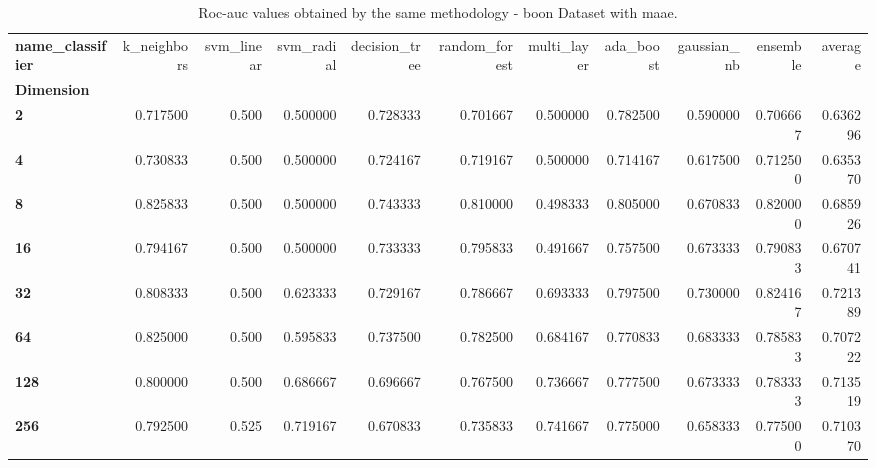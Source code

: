 \begin{table}
\centering
\caption{Roc-auc values obtained by the same methodology - boon Dataset with maae.}
\label{roc-auc_boon_maae-reproduction}
\begin{tabular}{lrrrrrrrrrr}
\toprule
\textbf{name\_classifier} &  k\_neighbors &  svm\_linear &  svm\_radial &  decision\_tree &  random\_forest &  multi\_layer &  ada\_boost &  gaussian\_nb &  ensemble &   average \\
\textbf{Dimension} &              &             &             &                &                &              &            &              &           &           \\
\midrule
\textbf{2        } &     0.717500 &       0.500 &    0.500000 &       0.728333 &       0.701667 &     0.500000 &   0.782500 &     0.590000 &  0.706667 &  0.636296 \\
\textbf{4        } &     0.730833 &       0.500 &    0.500000 &       0.724167 &       0.719167 &     0.500000 &   0.714167 &     0.617500 &  0.712500 &  0.635370 \\
\textbf{8        } &     0.825833 &       0.500 &    0.500000 &       0.743333 &       0.810000 &     0.498333 &   0.805000 &     0.670833 &  0.820000 &  0.685926 \\
\textbf{16       } &     0.794167 &       0.500 &    0.500000 &       0.733333 &       0.795833 &     0.491667 &   0.757500 &     0.673333 &  0.790833 &  0.670741 \\
\textbf{32       } &     0.808333 &       0.500 &    0.623333 &       0.729167 &       0.786667 &     0.693333 &   0.797500 &     0.730000 &  0.824167 &  0.721389 \\
\textbf{64       } &     0.825000 &       0.500 &    0.595833 &       0.737500 &       0.782500 &     0.684167 &   0.770833 &     0.683333 &  0.785833 &  0.707222 \\
\textbf{128      } &     0.800000 &       0.500 &    0.686667 &       0.696667 &       0.767500 &     0.736667 &   0.777500 &     0.673333 &  0.783333 &  0.713519 \\
\textbf{256      } &     0.792500 &       0.525 &    0.719167 &       0.670833 &       0.735833 &     0.741667 &   0.775000 &     0.658333 &  0.775000 &  0.710370 \\
\bottomrule
\end{tabular}
\end{table}
